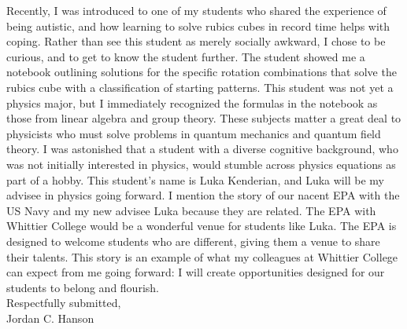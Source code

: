 \documentclass[../main.tex]{subfiles}
\begin{document}
Recently, I was introduced to one of my students who shared the experience of being autistic, and how learning to solve rubics cubes in record time helps with coping.  Rather than see this student as merely socially awkward, I chose to be curious, and to get to know the student further.  The student showed me a notebook outlining solutions for the specific rotation combinations that solve the rubics cube with a classification of starting patterns.  This student was not yet a physics major, but I immediately recognized the formulas in the notebook as those from linear algebra and group theory.  These subjects matter a great deal to physicists who must solve problems in quantum mechanics and quantum field theory.  I was astonished that a student with a diverse cognitive background, who was not initially interested in physics, would stumble across physics equations as part of a hobby.  This student's name is Luka Kenderian, and Luka will be my advisee in physics going forward.  I mention the story of our nacent EPA with the US Navy and my new advisee Luka because they are related.  The EPA with Whittier College would be a wonderful venue for students like Luka.  The EPA is designed to welcome students who are different, giving them a venue to share their talents.  This story is an example of what my colleagues at Whittier College can expect from me going forward: I will create opportunities designed for our students to belong and flourish.
\\ \vspace{0.15cm}
Respectfully submitted,
\\ \vspace{0.15cm}
Jordan C. Hanson
\end{document}
